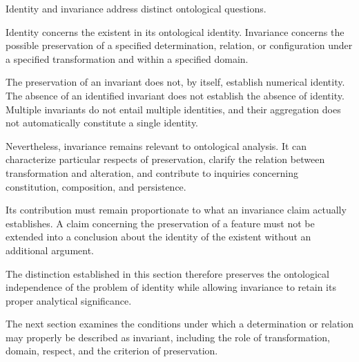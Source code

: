 Identity and invariance address distinct ontological
questions.

Identity concerns the existent in its ontological
identity. Invariance concerns the possible preservation
of a specified determination, relation, or configuration
under a specified transformation and within
a specified domain.

The preservation of an invariant does not, by
itself, establish numerical identity. The absence
of an identified invariant does not establish
the absence of identity. Multiple invariants
do not entail multiple identities, and their
aggregation does not automatically constitute
a single identity.

Nevertheless, invariance remains relevant to
ontological analysis. It can characterize particular
respects of preservation, clarify the relation
between transformation and alteration, and
contribute to inquiries concerning constitution,
composition, and persistence.

Its contribution must remain proportionate to
what an invariance claim actually establishes.
A claim concerning the preservation of a feature
must not be extended into a conclusion about
the identity of the existent without an additional
argument.

The distinction established in this section
therefore preserves the ontological independence
of the problem of identity while allowing
invariance to retain its proper analytical
significance.

The next section examines the conditions under
which a determination or relation may properly
be described as invariant, including the role
of transformation, domain, respect, and the
criterion of preservation.

